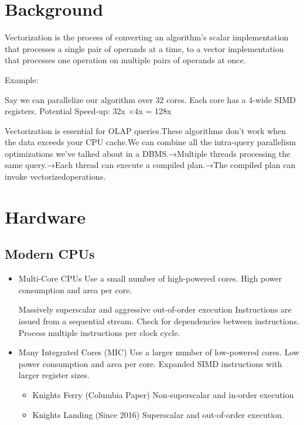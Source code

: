 \documentclass[11pt]{article}
\begin{document}
\maketitle
\thispagestyle{plain}

\section{Background}
Vectorization is the process of converting an algorithm's scalar implementation that processes a single pair of operands at a time, to a vector implementation that processes one operation on multiple pairs of operands at once.

Example:

Say we can parallelize our algorithm over 32 cores. Each core has a 4-wide SIMD registers. Potential Speed-up: 32x ×4x = 128x

Vectorization is essential for OLAP queries.These algorithms don’t work when the data exceeds your CPU cache.We can combine all the intra-query parallelism optimizations we’ve talked about in a DBMS.→Multiple threads processing the same query.→Each thread can execute a compiled plan.→The compiled plan can invoke vectorizedoperations.


\section{Hardware}
\subsection*{Modern CPUs}
\begin{itemize}
	\item 
	Multi-Core CPUs
	Use a small number of high-powered cores. High power consumption and area per core.
	
	Massively superscalar and aggressive out-of-order execution
	Instructions are issued from a sequential stream.
	Check for dependencies between instructions.
	Process multiple instructions per clock cycle.
	
	\item 
	Many Integrated Cores (MIC)
	Use a larger number of low-powered cores. Low power consumption and area per core. Expanded SIMD instructions with larger register sizes.
	
	\begin{itemize}
		\item 
		Knights Ferry (Columbia Paper)
		Non-superscalar and in-order execution
		
		\item 
		Knights Landing (Since 2016)
		Superscalar and out-of-order execution.
	\end{itemize}
\end{itemize}
\end{document}

